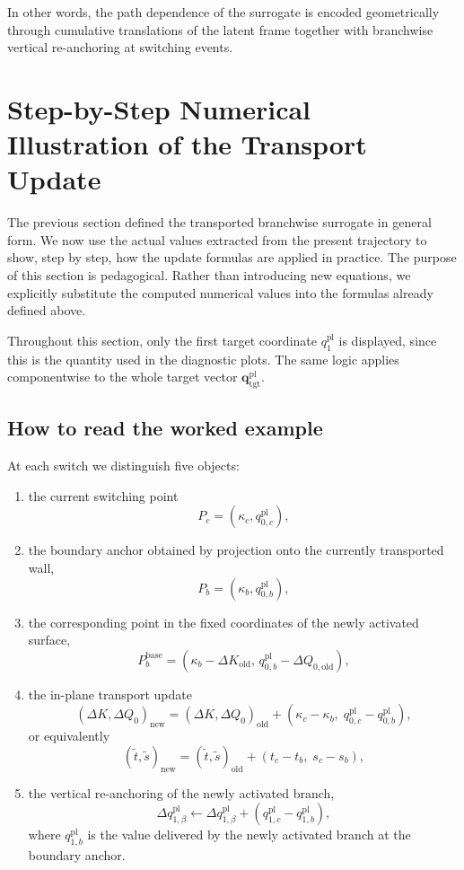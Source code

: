 \documentclass[11pt,a4paper]{article}
\begin{document}
In other words, the path dependence of the surrogate is encoded geometrically through cumulative translations of the latent frame together with branchwise vertical re-anchoring at switching events.

\section{Step-by-Step Numerical Illustration of the Transport Update}

The previous section defined the transported branchwise surrogate in general form. We now use the actual values extracted from the present trajectory to show, step by step, how the update formulas are applied in practice. The purpose of this section is pedagogical. Rather than introducing new equations, we explicitly substitute the computed numerical values into the formulas already defined above.

Throughout this section, only the first target coordinate \(q^{\mathrm{pl}}_1\) is displayed, since this is the quantity used in the diagnostic plots. The same logic applies componentwise to the whole target vector \(\mathbf{q}^{\mathrm{pl}}_{\mathrm{tgt}}\).

\subsection{How to read the worked example}

At each switch we distinguish five objects:
\begin{enumerate}
\item the current switching point
\[
P_c=(\kappa_c,q^{\mathrm{pl}}_{0,c}),
\]
\item the boundary anchor obtained by projection onto the currently transported wall,
\[
P_b=(\kappa_b,q^{\mathrm{pl}}_{0,b}),
\]
\item the corresponding point in the fixed coordinates of the newly activated surface,
\[
P_b^{\mathrm{base}}
=
(\kappa_b-\Delta K_{\mathrm{old}},\,q^{\mathrm{pl}}_{0,b}-\Delta Q_{0,\mathrm{old}}),
\]
\item the in-plane transport update
\[
(\Delta K,\Delta Q_0)_{\mathrm{new}}
=
(\Delta K,\Delta Q_0)_{\mathrm{old}}
+
(\kappa_c-\kappa_b,\;q^{\mathrm{pl}}_{0,c}-q^{\mathrm{pl}}_{0,b}),
\]
or equivalently
\[
(\tilde t,\tilde s)_{\mathrm{new}}
=
(\tilde t,\tilde s)_{\mathrm{old}}
+
(t_c-t_b,\;s_c-s_b),
\]
\item the vertical re-anchoring of the newly activated branch,
\[
\Delta q^{\mathrm{pl}}_{1,\beta}
\leftarrow
\Delta q^{\mathrm{pl}}_{1,\beta}
+
\left(
q^{\mathrm{pl}}_{1,c}
-
q^{\mathrm{pl}}_{1,b}
\right),
\]
where \(q^{\mathrm{pl}}_{1,b}\) is the value delivered by the newly activated branch at the boundary anchor.
\end{enumerate}
\end{document}
